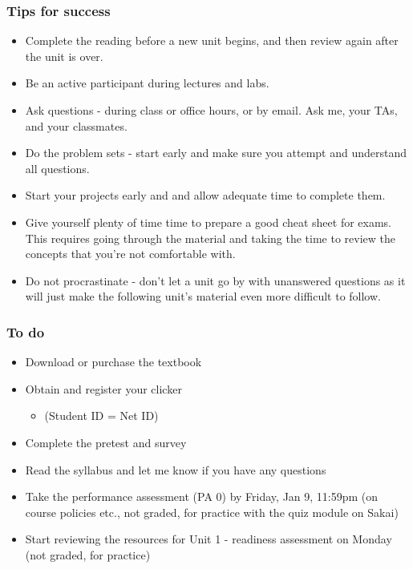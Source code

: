 \documentclass[slidestop,compress,mathserif,12pt,t,professionalfonts,xcolor=table]{beamer}
\begin{document}
\begin{frame}
\frametitle{Tips for success}

{\footnotesize
\begin{itemize}[<alert@+>]
\item Complete the reading before a new unit begins, and then review again after the unit is over.
\item Be an active participant during lectures and labs.
\item Ask questions - during class or office hours, or by email. Ask me, your TAs, and your classmates.
\item Do the problem sets - start early and make sure you attempt and understand all questions.
\item Start your projects early and and allow adequate time to complete them.
\item Give yourself plenty of time time to prepare a good cheat sheet for exams. This requires going through the material and taking the time to review the concepts that you're not comfortable with.
\item Do not procrastinate - don't let a unit go by with unanswered questions as it will just make the following unit's material even more difficult to follow. 
\end{itemize}
}

\end{frame}


\begin{frame}
\frametitle{To do}

\begin{itemize}

\item Download or purchase the textbook

\item Obtain and register your clicker
\begin{itemize}
\item {} (Student ID = Net ID)
\end{itemize}

\item Complete the pretest and survey

\item Read the syllabus and let me know if you have any questions

\item Take the performance assessment (PA 0) by Friday, Jan 9, 11:59pm (on course policies etc., not graded, for practice with the quiz module on Sakai)

\item Start reviewing the resources for Unit 1 - readiness assessment on Monday (not graded, for practice)

\end{itemize}

\end{frame}
\end{document}
